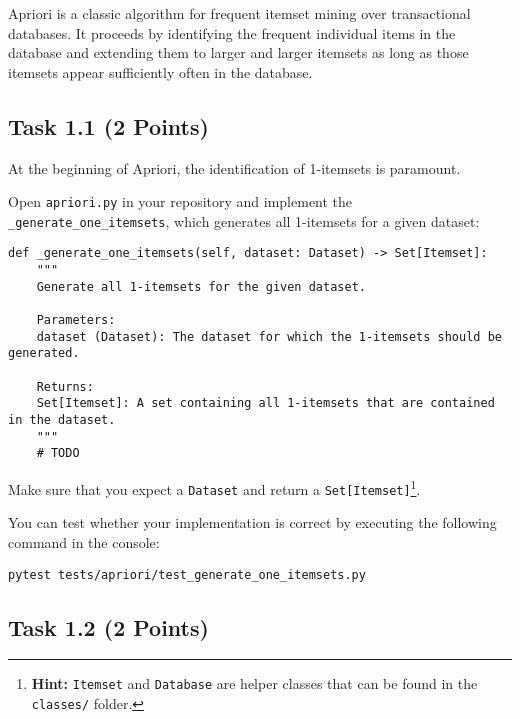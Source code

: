 \documentclass[
english,
smallborders
]{i6prcsht}
\newcommand{\points}[1]{\hfill \color{red}(#1 Points)\color{black}}
\begin{document}
Apriori is a classic algorithm for frequent itemset mining over transactional databases. It proceeds by identifying the frequent individual items in the database and extending them to larger and larger itemsets as long as those itemsets appear sufficiently often in the database.

\subsection*{Task 1.1 \points{2}}

At the beginning of Apriori, the identification of 1-itemsets is paramount.

Open \texttt{apriori.py} in your repository and implement the \texttt{\_generate\_one\_itemsets}, which generates all 1-itemsets for a given dataset:

\vspace*{0.3cm}

\begin{lstlisting}
def _generate_one_itemsets(self, dataset: Dataset) -> Set[Itemset]:
	"""
	Generate all 1-itemsets for the given dataset.

	Parameters:
	dataset (Dataset): The dataset for which the 1-itemsets should be generated.

	Returns:
	Set[Itemset]: A set containing all 1-itemsets that are contained in the dataset.
	"""
	# TODO
\end{lstlisting}

\vspace*{0.1cm}

Make sure that you expect a \texttt{Dataset} and return a \texttt{Set[Itemset]}\footnote{\textbf{Hint:} \texttt{Itemset} and \texttt{Database} are helper classes that can be found in the \texttt{classes/} folder.}.

You can test whether your implementation is correct by executing the following command in the console:

\vspace*{0.3cm}

\begin{lstlisting}
pytest tests/apriori/test_generate_one_itemsets.py
\end{lstlisting}

\vspace*{0.1cm}

\subsection*{Task 1.2 \points{2}}
\end{document}
